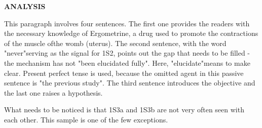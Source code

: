 \documentclass{ctexbook}
\begin{document}
\begin{sample}[label={myautocounter}]{\heiti}
  \noindent \textbf{ANALYSIS} 

  This paragraph involves four sentences. The first one provides the readers with the necessary knowledge of Ergometrine, a drug used to promote the contractions of the muscle ofthe womb (uterus). The second sentence, with the word "never"serving as the signal for 1S2, points out the gap that needs to be filled -the mechanism has not "been elucidated fully". Here, "elucidate"means to make clear. Present perfect tense is used, because the omitted agent in this passive sentence is "the previous study". The third sentence introduces the objective and the last one raises a hypothesis. 
  
  What needs to be noticed is that 1S3a and 1S3b are not very often seen with each other. This sample is one of the few exceptions.

\end{sample}
\end{document}
